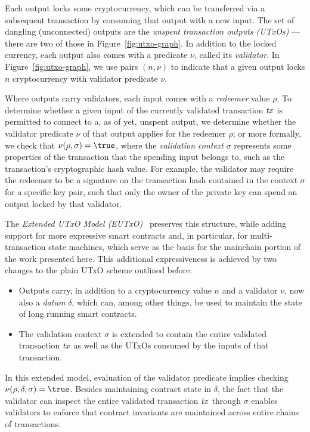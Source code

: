 Each output locks some cryptocurrency, which can be transferred via a subsequent transaction by consuming that output with a new input. The set of dangling (unconnected) outputs are the \emph{unspent transaction outputs (UTxOs)} --- there are two of those in Figure~\ref{fig:utxo-graph}. In addition to the locked currency, each output also comes with a predicate $\nu$, called its \emph{validator}. In Figure~\ref{fig:utxo-graph}, we use pairs \((n, \nu)\) to indicate that a given output locks $n$ cryptocurrency with validator predicate $\nu$.

Where outputs carry validators, each input comes with a \emph{redeemer} value $\rho$. To determine whether a given input of the currently validated transaction $\mathit{tx}$ is permitted to connect to a, as of yet, unspent output, we determine whether the validator predicate $\nu$ of that output applies for the redeemer $\rho$; or more formally, we check that \(\nu(\rho, \sigma) = \true\), where the \emph{validation context} $\sigma$ represents some properties of the transaction that the spending input belongs to, such as the transaction's cryptographic hash value. For example, the validator may require the redeemer to be a signature on the transaction hash contained in the context $\sigma$ for a specific key pair, such that only the owner of the private key can spend an output locked by that validator.

The \emph{Extended UTxO Model (EUTxO)}~\cite{eutxo} preserves this
structure, while adding support for more expressive smart contracts
and, in particular, for multi-transaction state machines, which serve
as the basis for the mainchain portion of the work presented
here. This additional expressiveness is achieved by two changes to the plain UTxO scheme outlined before: 
%
\begin{itemize}
\item Outputs carry, in addition to a cryptocurrency value $n$ and a validator $\nu$, now also a \emph{datum} $\delta$, which can, among other things, be used to maintain the state of long running smart contracts.
\item The validation context $\sigma$ is extended to contain the entire validated transaction $\mathit{tx}$ as well as the UTxOs consumed by the inputs of that transaction.
\end{itemize}
%
In this extended model, evaluation of the validator predicate implies checking \(\nu(\rho, \delta, \sigma) = \true\). Besides maintaining contract state in $\delta$, the fact that the validator can inspect the entire validated transaction $\mathit{tx}$ through $\sigma$ enables validators to enforce that contract invariants are maintained across entire chains of transactions.

